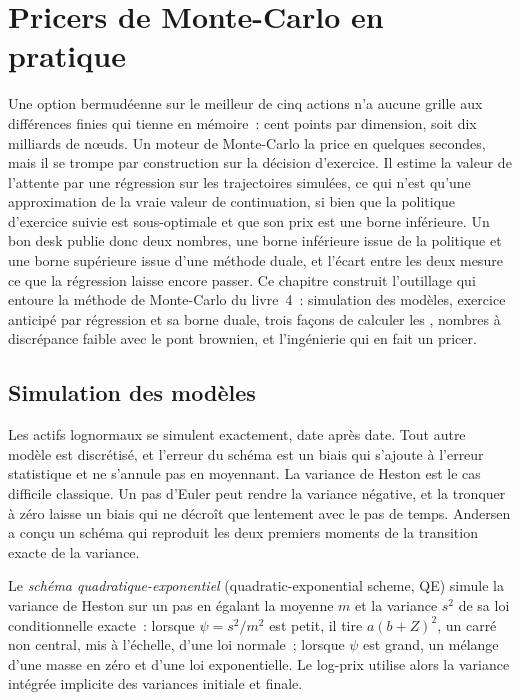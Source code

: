 \chapter{Pricers de Monte-Carlo en pratique}\label{ch:dv:monte-carlo-pricers-in-practice}

Une option bermudéenne sur le meilleur de cinq actions n'a aucune grille aux différences finies qui tienne en mémoire~: cent points par
dimension, soit dix milliards de nœuds. Un moteur de Monte-Carlo la price en quelques secondes, mais il se trompe par construction
sur la décision d'exercice. Il estime la valeur de l'attente par une régression sur les trajectoires simulées, ce qui n'est
qu'une approximation de la vraie valeur de continuation, si bien que la politique d'exercice suivie est sous-optimale et que son prix
est une borne inférieure. Un bon desk publie donc deux nombres, une borne inférieure issue de la politique et une borne supérieure issue d'une méthode duale, et l'écart entre
les deux mesure ce que la régression laisse encore passer. Ce chapitre construit l'outillage qui entoure la méthode
de Monte-Carlo du livre~4~: simulation des modèles, exercice anticipé par régression et sa borne duale, trois façons de calculer les ,
nombres à discrépance faible avec le pont brownien, et l'ingénierie qui en fait un pricer.

\section{Simulation des modèles}

Les actifs lognormaux se simulent exactement, date après date. Tout autre modèle est discrétisé, et l'erreur du schéma est un
biais qui s'ajoute à l'erreur statistique et ne s'annule pas en moyennant. La variance de Heston est le cas difficile classique. Un pas d'Euler
peut rendre la variance négative, et la tronquer à zéro laisse un biais qui ne décroît que lentement avec le pas de temps. Andersen
a conçu un schéma qui reproduit les deux premiers moments de la transition exacte de la variance.

\begin{definition}\label{def:dv:monte-carlo-pricers-in-practice:qe}
Le \emph{schéma quadratique-exponentiel} (quadratic-exponential scheme, QE) simule la variance de Heston sur un pas en égalant
la moyenne $m$ et la variance $s^2$ de sa loi conditionnelle exacte~: lorsque $\psi=s^2/m^2$ est petit, il tire $a(b+Z)^2$, un
carré non central, mis à l'échelle, d'une loi normale~; lorsque $\psi$ est grand, un mélange d'une masse en zéro et d'une loi exponentielle. Le log-prix utilise alors la
variance intégrée implicite des variances initiale et finale.
\end{definition}

